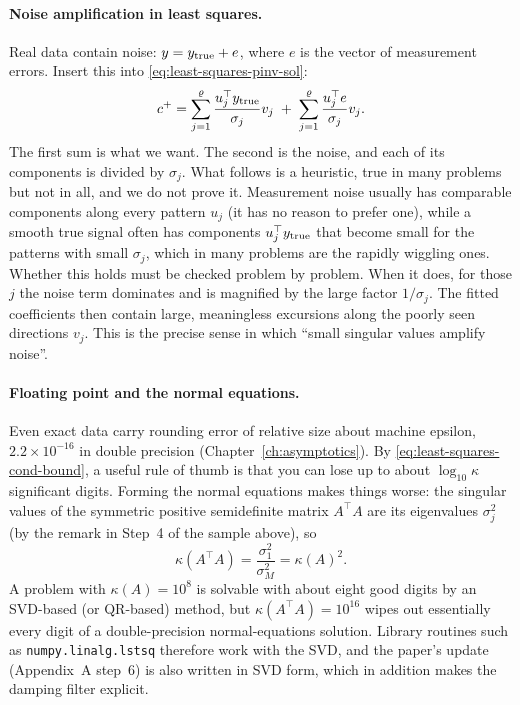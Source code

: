 \paragraph{Noise amplification in least squares.} Real data contain noise: $y = y_{\rm true} + e$, where $e$ is the vector of measurement errors. Insert this into \cref{eq:least-squares-pinv-sol}:
\begin{equation}
c^+ = \sum_{j=1}^{\varrho}\frac{u_j^\top y_{\rm true}}{\sigma_j}v_j \;+\; \sum_{j=1}^{\varrho}\frac{u_j^\top e}{\sigma_j}v_j .
\label{eq:least-squares-noise}
\end{equation}
The first sum is what we want. The second is the noise, and each of its components is divided by $\sigma_j$. What follows is a heuristic, true in many problems but not in all, and we do not prove it. Measurement noise usually has comparable components along every pattern $u_j$ (it has no reason to prefer one), while a smooth true signal often has components $u_j^\top y_{\rm true}$ that become small for the patterns with small $\sigma_j$, which in many problems are the rapidly wiggling ones. Whether this holds must be checked problem by problem. When it does, for those $j$ the noise term dominates and is magnified by the large factor $1/\sigma_j$. The fitted coefficients then contain large, meaningless excursions along the poorly seen directions $v_j$. This is the precise sense in which ``small singular values amplify noise''.

\paragraph{Floating point and the normal equations.} Even exact data carry rounding error of relative size about machine epsilon, $2.2\times10^{-16}$ in double precision (Chapter~\ref{ch:asymptotics}). By \cref{eq:least-squares-cond-bound}, a useful rule of thumb is that you can lose up to about $\log_{10}\kappa$ significant digits. Forming the normal equations makes things worse: the singular values of the symmetric positive semidefinite matrix $A^\top A$ are its eigenvalues $\sigma_j^2$ (by the remark in Step~4 of the sample above), so
\begin{equation}
\kappa(A^\top A) = \frac{\sigma_1^2}{\sigma_M^2} = \kappa(A)^2 .
\label{eq:least-squares-kappa2}
\end{equation}
A problem with $\kappa(A) = 10^8$ is solvable with about eight good digits by an SVD-based (or QR-based) method, but $\kappa(A^\top A) = 10^{16}$ wipes out essentially every digit of a double-precision normal-equations solution. Library routines such as \texttt{numpy.linalg.lstsq} therefore work with the SVD, and the paper's update (Appendix~A step~6) is also written in SVD form, which in addition makes the damping filter explicit.

